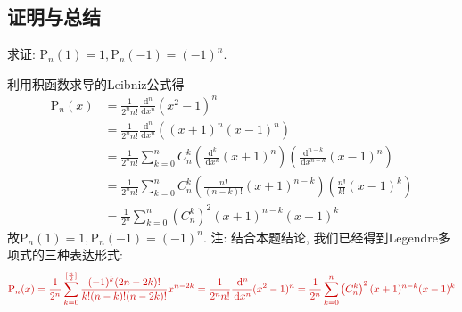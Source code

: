 \documentclass[titlepage,11pt,a4paper,twoside]{report}
\makeatletter
\newcommand\diff{\,\mathrm{d}}
\renewenvironment{proof}{\par
	\pushQED{\qed}%
	\normalfont \topsep1\p@\@plus6\p@\relax
	\trivlist
	\item\relax
	{\hspace*{\parindent}{\heiti 证明}\@addpunct{:}}\hspace\labelsep\ignorespaces
}{%
	\popQED\endtrivlist\@endpefalse
}
\makeatother
\begin{document}
\subsection{证明与总结}
求证: $\mathrm{P}_n(1)=1,\mathrm{P}_n(-1)=(-1)^n$.
\begin{proof}
利用积函数求导的Leibniz公式得
\[\begin{split}
\mathrm{P}_n(x)&=\frac{1}{2^nn!}\frac{\diff^n}{\diff x^n}(x^2-1)^n\\
&=\frac{1}{2^nn!}\frac{\diff^n}{\diff x^n}\left((x+1)^n(x-1)^n\right)\\
&=\frac{1}{2^nn!}\sum_{k=0}^nC_n^k\left(\frac{\diff^k}{\diff x^k}(x+1)^n\right)\left(\frac{\diff^{n-k}}{\diff x^{n-k}}(x-1)^n\right)\\
&=\frac{1}{2^nn!}\sum_{k=0}^nC_n^k\left(\frac{n!}{(n-k)!}(x+1)^{n-k}\right)\left(\frac{n!}{k!}(x-1)^k\right)\\
&=\frac{1}{2^n}\sum_{k=0}^n\left(C_n^k\right)^2(x+1)^{n-k}(x-1)^k
\end{split}\]
故$\mathrm{P}_n(1)=1,\mathrm{P}_n(-1)=(-1)^n$.
\end{proof}
注: 结合本题结论, 我们已经得到Legendre多项式的三种表达形式:\raggedbottom
\[{\color{bostonuniversityred}\mathrm{P}_n(x)=\frac{1}{2^n}\sum_{k=0}^{[\frac{n}{2}]}\frac{(-1)^k(2n-2k)!}{k!(n-k)!(n-2k)!}x^{n-2k}=\frac{1}{2^nn!}\frac{\diff^n}{\diff x^n}(x^2-1)^n=\frac{1}{2^n}\sum_{k=0}^n\left(C_n^k\right)^2(x+1)^{n-k}(x-1)^k}\]
\end{document}
